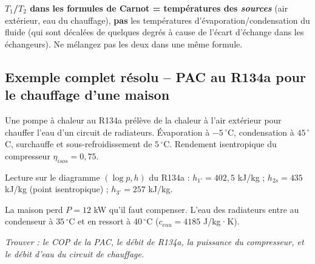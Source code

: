 \begin{piege}
\textbf{$T_1$/$T_2$ dans les formules de Carnot = températures des \emph{sources}} (air extérieur, eau du
chauffage), \textbf{pas} les températures d'évaporation/condensation du fluide (qui sont décalées de
quelques degrés à cause de l'écart d'échange dans les échangeurs). Ne mélangez pas les deux dans une même
formule.
\end{piege}

\newpage
\subsection{Exemple complet résolu -- PAC au R134a pour le chauffage d'une maison}

\begin{enonce}
Une pompe à chaleur au R134a prélève de la chaleur à l'air extérieur pour chauffer l'eau d'un circuit de
radiateurs. Évaporation à $-5\,^\circ$C, condensation à $45\,^\circ$C, surchauffe et sous-refroidissement
de $5\,^\circ$C. Rendement isentropique du compresseur $\eta_{isos}=0{,}75$.

Lecture sur le diagramme $(\log p,h)$ du R134a : $h_{1'}=402{,}5$ kJ/kg ; $h_{2s}=435$ kJ/kg (point
isentropique) ; $h_{3'}=257$ kJ/kg.

La maison perd $P=12$ kW qu'il faut compenser. L'eau des radiateurs entre au condenseur à $35\,^\circ$C
et en ressort à $40\,^\circ$C ($c_{eau}=4185$ J/kg·K).

\emph{Trouver : le COP de la PAC, le débit de R134a, la puissance du compresseur, et le débit d'eau du
circuit de chauffage.}
\end{enonce}

